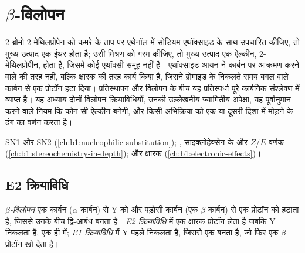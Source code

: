 \chapter{\texorpdfstring{$\beta$}{बीटा}-विलोपन}\label{ch:b1:elimination}

2-ब्रोमो-2-मेथिलप्रोपेन को कमरे के ताप पर एथेनॉल में सोडियम एथॉक्साइड के साथ
उपचारित कीजिए, तो मुख्य उत्पाद एक ईथर होता है; उसी मिश्रण को गरम कीजिए, तो
मुख्य उत्पाद एक ऐल्कीन, 2-मेथिलप्रोपीन, होता है, जिसमें कोई एथॉक्सी समूह
नहीं है। एथॉक्साइड आयन ने कार्बन पर आक्रमण करने वाले  की तरह नहीं, बल्कि
क्षारक की तरह कार्य किया है, जिसने ब्रोमाइड के निकलते समय बगल वाले कार्बन से
एक प्रोटॉन हटा दिया। प्रतिस्थापन और विलोपन के बीच यह प्रतिस्पर्धा
पूरे कार्बनिक संश्लेषण में व्याप्त है। यह अध्याय दोनों विलोपन
क्रियाविधियों, उनकी उल्लेखनीय ज्यामितीय अपेक्षा, यह पूर्वानुमान करने वाले नियम कि
कौन-सी ऐल्कीन बनेगी, और किसी अभिक्रिया को एक या दूसरी दिशा में मोड़ने के
ढंग का वर्णन करता है।

\begin{recall}
SN1 और SN2 (\cref{ch:b1:nucleophilic-substitution}); ,
साइक्लोहेक्सेन के  और $Z$/$E$ वर्णक
(\cref{ch:b1:stereochemistry-in-depth});  और क्षारक
(\cref{ch:b1:electronic-effects})।
\end{recall}

\section{E2 क्रियाविधि}

\begin{definition}\label{def:b1:elimination:elimination}
\emph{$\beta$-विलोपन} एक कार्बन ($\alpha$ कार्बन) से
 Y को और पड़ोसी कार्बन (एक $\beta$ कार्बन) से एक प्रोटॉन को
हटाता है, जिससे उनके बीच द्वि-आबंध बनता है। \emph{E2 क्रियाविधि} में
एक क्षारक प्रोटॉन लेता है जबकि Y निकलता है, एक ही  में; \emph{E1
क्रियाविधि} में Y पहले निकलता है, जिससे एक  बनता है, जो
फिर एक $\beta$ प्रोटॉन खो देता है।
\end{definition}

